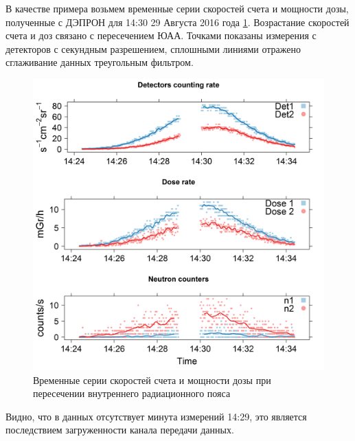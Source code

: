 В качестве примера возьмем временные серии скоростей счета и мощности дозы, полученные с ДЭПРОН для 14:30 29 Августа 2016 года \ref{fig:depronseclognew08-29-1614-24-23}. Возрастание скоростей счета и доз связано с пересечением ЮАА. Точками показаны измерения с детекторов с секундным разрешением, сплошными линиями отражено сглаживание данных треугольным фильтром.

\begin{figure}
	\centering
	\includegraphics[width=0.5\linewidth]{images/results/depron_sec_log_new08-29-1614-24-23}
	\caption{Временные серии скоростей счета и мощности дозы при пересечении внутреннего радиационного пояса}	\label{fig:depronseclognew08-29-1614-24-23}
\end{figure}

Видно, что в данных отсутствует минута измерений 14:29, это является последствием загруженности канала передачи данных. 




